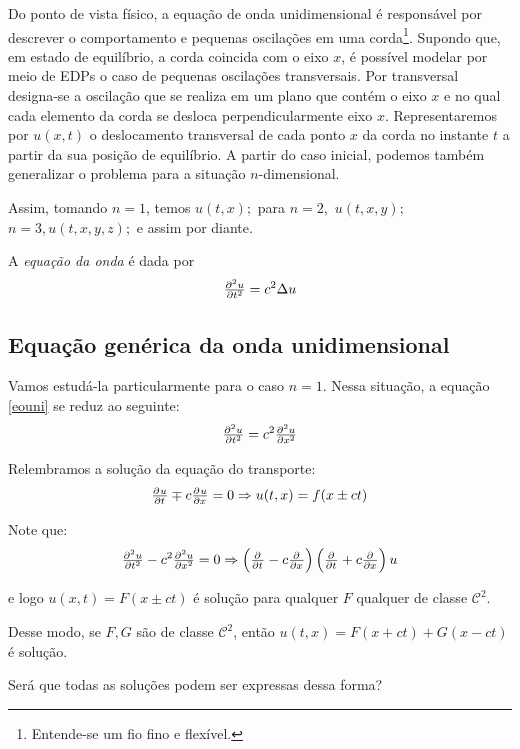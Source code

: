 \documentclass[11pt,twoside,a4paper]{book}
\begin{document}
Do ponto de vista físico, a equação de onda unidimensional é responsável por descrever o comportamento e pequenas oscilações em uma corda\footnote{Entende-se um fio fino e flexível.}. Supondo que, em estado de equilíbrio, a corda coincida com o eixo $x$, é possível modelar por meio de EDPs o caso de pequenas oscilações transversais. Por transversal designa-se a oscilação que se realiza em um plano que contém o eixo $x$ e no qual cada elemento da corda se desloca perpendicularmente eixo $x$. Representaremos por $u(x,t)$ o deslocamento transversal de cada ponto $x$ da corda no instante $t$ a partir da sua posição de equilíbrio.
A partir do caso inicial, podemos também generalizar o problema para a situação $n$-dimensional.

\medskip
\noindent
Assim, tomando $n = 1$, temos $u(t,x);$ para $n = 2,$ $u(t,x,y);$ $n = 3, u(t,x,y,z);$ e assim por diante.

\medskip
\noindent
A \emph{equação da onda} é dada por
\begin{equation}\label{eouni}
   \pd[2]{u}{t} = c^2 \Delta u 
\end{equation}

\subsection{Equação genérica da onda unidimensional}

\noindent
Vamos estudá-la particularmente para o caso $n = 1.$ Nessa situação, a equação \ref{eouni} se reduz ao seguinte:
\[
\pd[2]{u}{t} = c^2\pd[2]{u}{x}
\]

\noindent
Relembramos a solução da equação do transporte:
\[
\pd{u}{t}\mp c\pd{u}{x}=0\Rightarrow u(t,x)=f(x\pm ct)
\]

\medskip
\noindent
Note que:
\[
\pd[2]{u}{t}-c^2\pd[2]{u}{x}=0\Rightarrow\left(\pd{}{t}-c\pd{}{x}\right)\left(\pd{}{t}+c\pd{}{x}\right)u
\]

\noindent
e logo $u(x,t)=F(x\pm ct)$ é solução para qualquer $F$ qualquer de classe $\mathcal{C}^2$.

\smallskip
\noindent
Desse modo, se $F,G$ são de classe $\mathcal{C}^2$, então $u(t,x)=F(x+ct)+G(x-ct)$ é solução.

\smallskip
\noindent
Será que todas as soluções podem ser expressas dessa forma?
\end{document}
